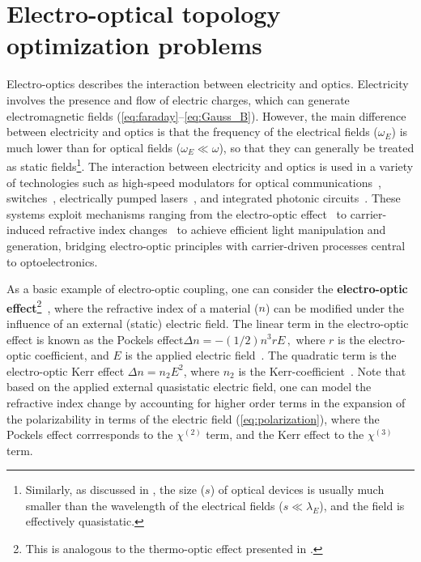 \chapter{Electro-optical topology optimization problems}\label{chap:eo}
Electro-optics describes the interaction between electricity and optics. Electricity involves the presence and flow of electric charges, which can generate electromagnetic fields (\eqref{eq:faraday}--\eqref{eq:Gauss_B}).
However, the main difference between electricity and optics is that the frequency of the electrical fields ($\omega_E$)
is much lower than for optical fields ($\omega_E \ll \omega $), so that they can generally be treated as static fields\footnote{Similarly, as discussed in , the size ($s$) of optical devices
is usually much smaller than the wavelength of the electrical fields ($s\ll \lambda_E $), and the field is effectively quasistatic.}.
The interaction between electricity and optics is used in a variety of technologies such as high-speed modulators for optical communications~\cite{modu, modu1, modu2, pockels}, switches~\cite{eo_switch}, electrically pumped lasers~\cite{laser,laser_pic}, and integrated photonic circuits~\cite{laser_pic}. 
These systems exploit mechanisms ranging from the electro-optic effect~\cite{eo_effect} to carrier-induced refractive index
 changes~\cite{c_i_n} to achieve efficient light manipulation and generation, bridging electro-optic principles with carrier-driven processes central to optoelectronics.

As a basic example of electro-optic coupling, one can consider the \textbf{electro-optic effect}\footnote{This is analogous to the thermo-optic effect presented in .}~\cite{eo_effect},
where the refractive index of a material ($n$) can be modified under the influence of an external (static) electric field. The linear term in the electro-optic effect is known as the
Pockels effect$
    \Delta n = -(1/2) n^3 r E\,,$
where $r$ is the electro-optic coefficient, and $E$ is the applied electric field~\cite{pockels}. The quadratic term 
is the electro-optic Kerr effect $\Delta n = n_2 E^2$, where $n_2$ is the Kerr-coefficient~\cite{phot_crys}. Note that based on the applied external
quasistatic electric field, one can model the refractive index change by accounting for higher order terms in the expansion of the polarizability
in terms of the electric field (\eqref{eq:polarization}), where the Pockels effect corrresponds to the $\chi^{(2)}$ term, and the Kerr effect to the $\chi^{(3)}$ term.

